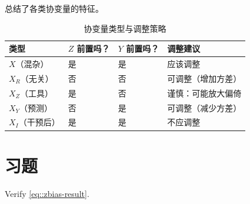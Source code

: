  总结了各类协变量的特征。

\begin{table}[h]
\centering
\caption{协变量类型与调整策略}\label{tab:16-covariate-types}
\begin{tabular}{llll}
\hline
类型 & $Z$ 前置吗？ & $Y$ 前置吗？ & 调整建议 \\
\hline
$X$（混杂） & 是 & 是 & 应该调整 \\
$X_R$（无关） & 否 & 否 & 可调整（增加方差） \\
$X_Z$（工具） & 是 & 否 & 谨慎：可能放大偏倚 \\
$X_Y$（预测） & 否 & 是 & 可调整（减少方差） \\
$X_I$（干预后） & 是 & 是 & 不应调整 \\
\hline
\end{tabular}
\end{table}

\section{习题}\label{sec:16-homework}

\begin{HomeworkProblem}\label{exr:16-1}
Verify \eqref{eq::zbias-result}.


\end{HomeworkProblem}

